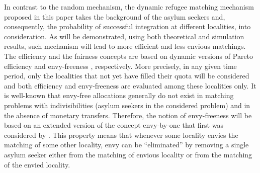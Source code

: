 \documentclass[12pt,fleqn]{article}
\begin{document}
In contrast to the random mechanism, the dynamic refugee matching mechanism proposed in this paper takes the background of the asylum seekers and, consequently, the probability of successful integration at different localities, into consideration. As will be demonstrated, using both theoretical and simulation results, such mechanism will lead to more efficient and less envious matchings. The efficiency and the fairness concepts are based on dynamic versions of Pareto efficiency and envy-freeness \citep{bib:Foley}, respectively. More precisely, in any given time period, only the localities that not yet have filled their quota will be considered and both efficiency and envy-freeness are evaluated among these localities only. It is well-known that envy-free allocations generally do not exist in matching problems with indivisibilities (asylum seekers in the considered problem) and in the absence of monetary transfers. Therefore, the notion of envy-freeness will be based on an extended version of the concept envy-by-one that first was considered by \citet{bib:Budish}. This property means that whenever some locality envies the matching of some other locality, envy can be ``eliminated'' by removing a single asylum seeker either from the matching of envious locality or from the matching of the envied locality.
\end{document}
